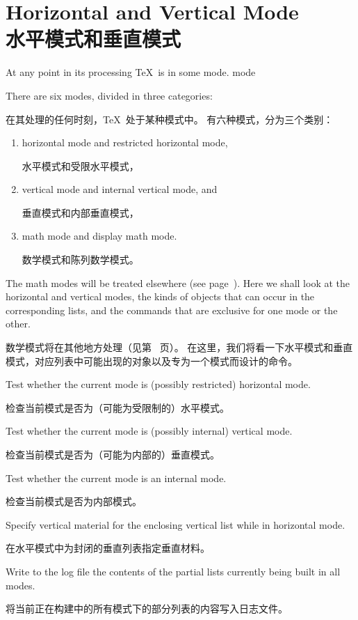 
\endofchapter
\chapter{Horizontal and Vertical Mode\\水平模式和垂直模式}\label{hvmode}


At any point in its processing \TeX\ is in some mode.
\term mode\par
There are six modes, divided in three categories:

在其处理的任何时刻，\TeX\ 处于某种模式中。
有六种模式，分为三个类别：
\begin{enumerate} \item horizontal mode and restricted horizontal
mode, 

水平模式和受限水平模式，
\item vertical mode and internal vertical mode, and

垂直模式和内部垂直模式，
\item math mode and display math mode.

数学模式和陈列数学模式。\end{enumerate}
The math modes will be treated elsewhere (see page~\pageref{math:modes}).
Here we shall look
at the horizontal and vertical modes, the kinds of objects
that can occur in the corresponding lists, and the
commands that are exclusive for one mode or the other. 

数学模式将在其他地方处理（见第~\pageref{math:modes} 页）。
在这里，我们将看一下水平模式和垂直模式，对应列表中可能出现的对象以及专为一个模式而设计的命令。


\begin{inventory}
\item [\cs{ifhmode}] 
      Test whether the current mode is (possibly restricted) horizontal mode.

      检查当前模式是否为（可能为受限制的）水平模式。
\item [\cs{ifvmode}] 
      Test whether the current mode is (possibly internal) vertical mode.

      检查当前模式是否为（可能为内部的）垂直模式。
\item [\cs{ifinner}] 
      Test whether the current mode is an internal mode.

      检查当前模式是否为内部模式。
\item [\cs{vadjust}] 
      Specify vertical material for the enclosing vertical list
      while in horizontal mode.

      在水平模式中为封闭的垂直列表指定垂直材料。
\item [\cs{showlists}] 
      Write to the log file the contents of the partial lists 
      currently being built in all modes.

      将当前正在构建中的所有模式下的部分列表的内容写入日志文件。
\end{inventory}


